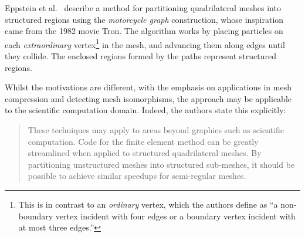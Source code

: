 




Eppstein et al.~\cite{eppstein2008motorcycle} describe a method for partitioning quadrilateral meshes into structured regions using the \emph{motorcycle graph} construction, whose inspiration came from the 1982 movie Tron. The algorithm works by placing particles on each \emph{extraordinary} vertex\footnote{\label{footnote:extraordinary-vertices} This is in contrast to an \emph{ordinary} vertex, which the authors define as ``a non-boundary vertex incident with four edges or a boundary vertex incident with at most three edges.''} in the mesh, and advancing them along edges until they collide. The enclosed regions formed by the paths represent structured regions.

Whilst the motivations are different, with the emphasis on applications in mesh compression and detecting mesh isomorphisms, the approach may be applicable to the scientific computation domain. Indeed, the authors state this explicitly:
\begin{quote}
These techniques may apply to areas beyond graphics such as scientific computation. Code for the finite element method can be greatly streamlined when applied to structured quadrilateral meshes. By partitioning unstructured meshes into structured sub-meshes, it should be possible to achieve similar speedups for semi-regular meshes.
\end{quote}

